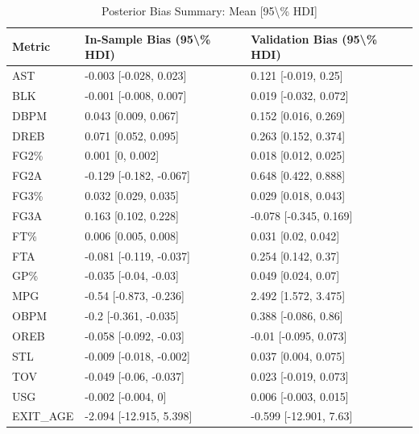 \begin{table}[t]
\caption*{
{\fontsize{20}{25}\selectfont  Posterior Bias Summary: Mean [95\textbackslash{}\% HDI]\fontsize{12}{15}\selectfont }
} 
\fontsize{12.0pt}{14.0pt}\selectfont
\begin{tabular*}{\linewidth}{@{\extracolsep{\fill}}lll}
\toprule
Metric & In-Sample Bias (95\textbackslash{}\% HDI) & Validation Bias (95\textbackslash{}\% HDI) \\ 
\midrule\addlinespace[2.5pt]
AST & -0.003 [-0.028, 0.023] & 0.121 [-0.019, 0.25] \\ 
BLK & -0.001 [-0.008, 0.007] & 0.019 [-0.032, 0.072] \\ 
DBPM & 0.043 [0.009, 0.067] & 0.152 [0.016, 0.269] \\ 
DREB & 0.071 [0.052, 0.095] & 0.263 [0.152, 0.374] \\ 
FG2\% & 0.001 [0, 0.002] & 0.018 [0.012, 0.025] \\ 
FG2A & -0.129 [-0.182, -0.067] & 0.648 [0.422, 0.888] \\ 
FG3\% & 0.032 [0.029, 0.035] & 0.029 [0.018, 0.043] \\ 
FG3A & 0.163 [0.102, 0.228] & -0.078 [-0.345, 0.169] \\ 
FT\% & 0.006 [0.005, 0.008] & 0.031 [0.02, 0.042] \\ 
FTA & -0.081 [-0.119, -0.037] & 0.254 [0.142, 0.37] \\ 
GP\% & -0.035 [-0.04, -0.03] & 0.049 [0.024, 0.07] \\ 
MPG & -0.54 [-0.873, -0.236] & 2.492 [1.572, 3.475] \\ 
OBPM & -0.2 [-0.361, -0.035] & 0.388 [-0.086, 0.86] \\ 
OREB & -0.058 [-0.092, -0.03] & -0.01 [-0.095, 0.073] \\ 
STL & -0.009 [-0.018, -0.002] & 0.037 [0.004, 0.075] \\ 
TOV & -0.049 [-0.06, -0.037] & 0.023 [-0.019, 0.073] \\ 
USG & -0.002 [-0.004, 0] & 0.006 [-0.003, 0.015] \\ 
EXIT\_AGE & -2.094 [-12.915, 5.398] & -0.599 [-12.901, 7.63] \\ 
\bottomrule
\end{tabular*}
\end{table}

